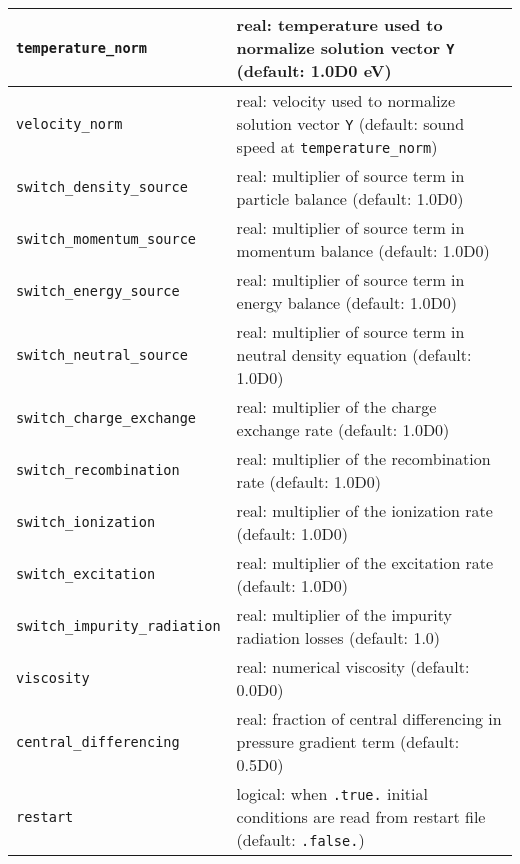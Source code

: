 \documentclass[amsmath,amssymb,a4]{revtex4}
\begin{document}
\begin{table}[h]
\begin{center}
\begin{tabular}{|| l  | l ||}
	{\tt temperature\_norm}      & real: temperature used to normalize solution vector {\tt Y} (default: 1.0D0 eV) \\ \hline
	{\tt velocity\_norm}         & real: velocity used to normalize solution vector {\tt Y} (default: sound speed at {\tt temperature\_norm}) \\ \hline
	{\tt switch\_density\_source} & real: multiplier of source term in particle balance (default: 1.0D0) \\ \hline
	{\tt switch\_momentum\_source}& real: multiplier of source term in momentum balance (default: 1.0D0) \\ \hline
	{\tt switch\_energy\_source}  & real: multiplier of source term in energy balance (default: 1.0D0) \\ \hline
	{\tt switch\_neutral\_source} & real: multiplier of source term in neutral density equation (default: 1.0D0) \\ \hline
	{\tt switch\_charge\_exchange}& real: multiplier of the charge exchange rate (default: 1.0D0) \\ \hline
	{\tt switch\_recombination}  & real: multiplier of the recombination rate (default: 1.0D0) \\ \hline
	{\tt switch\_ionization}     & real: multiplier of the ionization rate (default: 1.0D0) \\ \hline
	{\tt switch\_excitation}     & real: multiplier of the excitation rate (default: 1.0D0) \\ \hline
	{\tt switch\_impurity\_radiation}& real: multiplier of the impurity radiation losses (default: 1.0) \\ \hline
	{\tt viscosity}              & real: numerical viscosity (default: 0.0D0)  \\ \hline
	{\tt central\_differencing}   & real: fraction of central differencing in pressure gradient term (default: 0.5D0) \\ \hline
	{\tt restart}                & logical: when {\tt .true.} initial conditions are read from restart file (default: {\tt .false.}) \\ \hline
    \hline
  \end{tabular}
\end{center}
\end{table}
\end{document}
